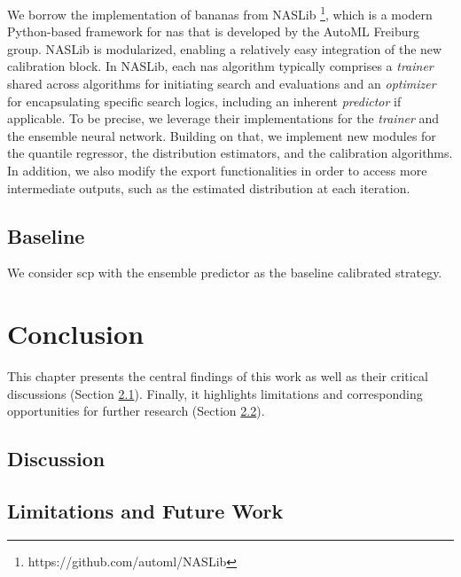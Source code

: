 \documentclass[a4paper,oneside,bibliography=totoc]{scrbook}
\begin{document}
{We borrow the implementation of \gls{bananas} from NASLib \footnote{https://github.com/automl/NASLib}, which is a modern Python-based framework for \gls{nas} that is developed by the AutoML Freiburg group. NASLib is modularized, enabling a relatively easy integration of the new calibration block. In NASLib, each \gls{nas} algorithm typically comprises a \textit{trainer} shared across algorithms for initiating search and evaluations and an \textit{optimizer} for encapsulating specific search logics, including an inherent \textit{predictor} if applicable. To be precise, we leverage their implementations for the \textit{trainer} and the ensemble neural network. Building on that, we implement new modules for the quantile regressor, the distribution estimators, and the calibration algorithms. In addition, we also modify the export functionalities in order to access more intermediate outputs, such as the estimated distribution at each iteration.

\section{Baseline}
We consider \gls{scp} with the ensemble predictor as the baseline calibrated strategy. 


\chapter{Conclusion}
This chapter presents the central findings of this work as well as their critical discussions (Section \ref{sec: discussion}). Finally, it highlights limitations and corresponding opportunities for further research (Section \ref{sec: future_work}).

\section{Discussion}
\label{sec: discussion}

\section{Limitations and Future Work}
\label{sec: future_work}





\listofalgorithms 
\listoffigures 
\listoftables
\printglossary[type=\acronymtype, title=Acronyms]

\appendix
}
\end{document}
